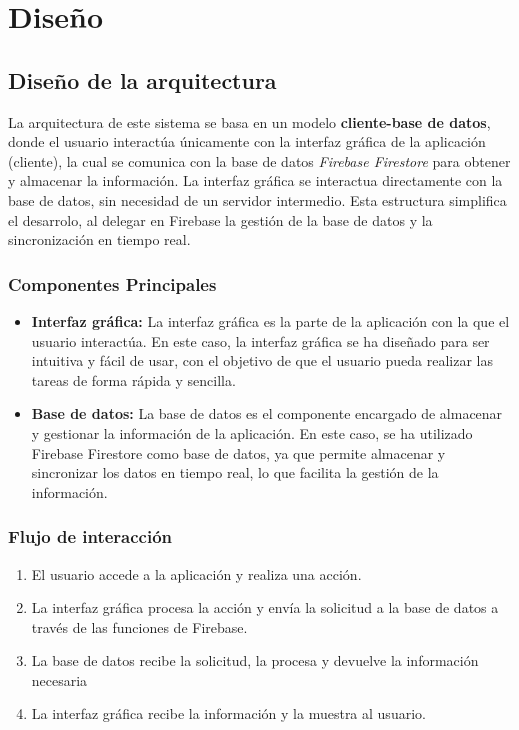 \chapter{Diseño}

\section{Diseño de la arquitectura}
\label{sec:arquitectura}
La arquitectura de este sistema se basa en un modelo \textbf{cliente-base de datos}, donde el usuario interactúa únicamente con 
la interfaz gráfica de la aplicación (cliente), la cual se comunica con la base de datos \textit{Firebase Firestore} para obtener y almacenar la información. 
La interfaz gráfica se interactua directamente con la base de datos, sin necesidad de un servidor intermedio. Esta estructura simplifica el
desarrolo, al delegar en Firebase la gestión de la base de datos y la sincronización en tiempo real.

\subsection{Componentes Principales}

\begin{itemize}
    \item \textbf{Interfaz gráfica:} La interfaz gráfica es la parte de la aplicación con la que el usuario interactúa. 
    En este caso, la interfaz gráfica se ha diseñado para ser intuitiva y fácil de usar, con el objetivo de que el usuario pueda 
    realizar las tareas de forma rápida y sencilla.
    \item \textbf{Base de datos:} La base de datos es el componente encargado de almacenar y gestionar la información de la aplicación. 
    En este caso, se ha utilizado Firebase Firestore como base de datos, ya que permite almacenar y sincronizar los datos en tiempo real, 
    lo que facilita la gestión de la información.
\end{itemize}

\subsection{Flujo de interacción}

\begin{enumerate}
    \item El usuario accede a la aplicación y realiza una acción.
    \item La interfaz gráfica procesa la acción y envía la solicitud a la base de datos a través de las funciones de Firebase.
    \item La base de datos recibe la solicitud, la procesa y devuelve la información necesaria
    \item La interfaz gráfica recibe la información y la muestra al usuario.
\end{enumerate}



